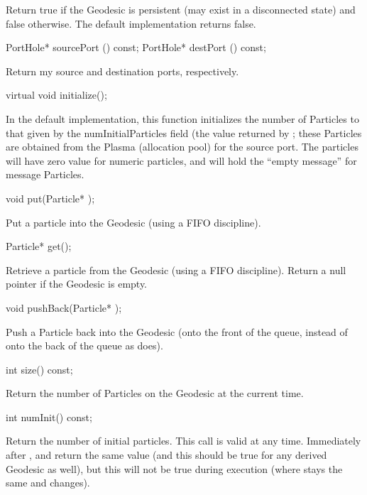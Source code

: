 Return true if the Geodesic is persistent (may exist in a disconnected
state) and false otherwise.  The default implementation returns false.

\begin{example}
PortHole* sourcePort () const;
PortHole* destPort () const;
\end{example}

Return my source and destination ports, respectively.

\begin{example}
virtual void initialize();
\end{example}

In the default implementation, this function initializes the number of
Particles to that given by the numInitialParticles field (the value
returned by ; these Particles are obtained from the
Plasma (allocation pool) for the source port.  The particles will
have zero value for numeric particles, and will hold the ``empty message''
for message Particles.

\begin{example}
void put(Particle* );
\end{example}

Put a particle into the Geodesic (using a FIFO discipline).

\begin{example}
Particle* get();
\end{example}

Retrieve a particle from the Geodesic (using a FIFO discipline).
Return a null pointer if the Geodesic is empty.

\begin{example}
void pushBack(Particle* );
\end{example}

Push a Particle back into the Geodesic (onto the front of the queue,
instead of onto the back of the queue as  does).

\begin{example}
int size() const;
\end{example}

Return the number of Particles on the Geodesic at the current time.

\begin{example}
int numInit() const;
\end{example}

Return the number of initial particles.  This call is valid at any
time.  Immediately after ,  and
 return the same value (and this should be true for
any derived Geodesic as well), but this will not be true during
execution (where  stays the same and 
changes).

